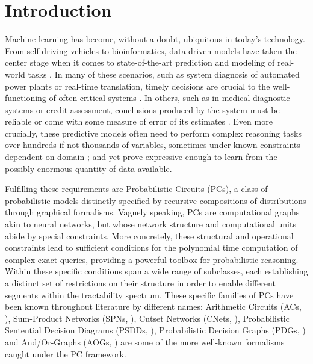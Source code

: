 \chapter{Introduction}

Machine learning has become, without a doubt, ubiquitous in today's technology. From self-driving
vehicles to bioinformatics, data-driven models have taken the center stage when it comes to
state-of-the-art prediction and modeling of real-world tasks \citep{grigorescu20,lan18,li19,khan18,
sezer20}. In many of these scenarios, such as system diagnosis of automated power plants or
real-time translation, timely decisions are crucial to the well-functioning of often critical
systems \citep{enshaei19,niehues18}. In others, such as in medical diagnostic systems or credit
assessment, conclusions produced by the system must be reliable or come with some measure of error
of its estimates \citep{lou19,xolani20}. Even more crucially, these predictive models often need to
perform complex reasoning tasks over hundreds if not thousands of variables, sometimes under known
constraints dependent on domain \citep{xu18,marin20,wong12,lu13}; and yet prove expressive enough
to learn from the possibly enormous quantity of data available.

Fulfilling these requirements are Probabilistic Circuits (PCs), a class of probabilistic models
distinctly specified by recursive compositions of distributions through graphical formalisms.
Vaguely speaking, PCs are computational graphs akin to neural networks, but whose network structure
and computational units abide by special constraints. More concretely, these structural and
operational constraints lead to sufficient conditions for the polynomial time computation of
complex exact queries, providing a powerful toolbox for probabilistic reasoning. Within these
specific conditions span a wide range of subclasses, each establishing a distinct set of
restrictions on their structure in order to enable different segments within the tractability
spectrum. These specific families of PCs have been known throughout literature by different names:
Arithmetic Circuits (ACs, \cite{darwiche03}), Sum-Product Networks (SPNs, \cite{poon11}), Cutset
Networks (CNets, \cite{rahman14}), Probabilistic Sentential Decision Diagrams (PSDDs,
\cite{kisa14}), Probabilistic Decision Graphs (PDGs, \cite{jaeger04}) and And/Or-Graphs (AOGs,
\cite{dechter07}) are some of the more well-known formalisms caught under the PC framework.

